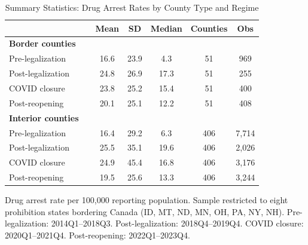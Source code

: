 \begin{table}[htbp]
\centering
\caption{Summary Statistics: Drug Arrest Rates by County Type and Regime}
\label{tab:summary}
\begin{tabular}{llccccc}
\hline\hline
 & & Mean & SD & Median & Counties & Obs \\
\hline
\textbf{Border counties} & & & & & & \\
\quad Pre-legalization & & 16.6 & 23.9 & 4.3 & 51 & 969 \\
\quad Post-legalization & & 24.8 & 26.9 & 17.3 & 51 & 255 \\
\quad COVID closure & & 23.8 & 25.2 & 15.4 & 51 & 400 \\
\quad Post-reopening & & 20.1 & 25.1 & 12.2 & 51 & 408 \\
\textbf{Interior counties} & & & & & & \\
\quad Pre-legalization & & 16.4 & 29.2 & 6.3 & 406 & 7,714 \\
\quad Post-legalization & & 25.5 & 35.1 & 19.6 & 406 & 2,026 \\
\quad COVID closure & & 24.9 & 45.4 & 16.8 & 406 & 3,176 \\
\quad Post-reopening & & 19.5 & 25.6 & 13.3 & 406 & 3,244 \\
\hline\hline
\end{tabular}
\begin{tablenotes}[flushleft]
\small
\item Drug arrest rate per 100,000 reporting population. Sample restricted to eight prohibition states bordering Canada (ID, MT, ND, MN, OH, PA, NY, NH). Pre-legalization: 2014Q1--2018Q3. Post-legalization: 2018Q4--2019Q4. COVID closure: 2020Q1--2021Q4. Post-reopening: 2022Q1--2023Q4.
\end{tablenotes}
\end{table}
